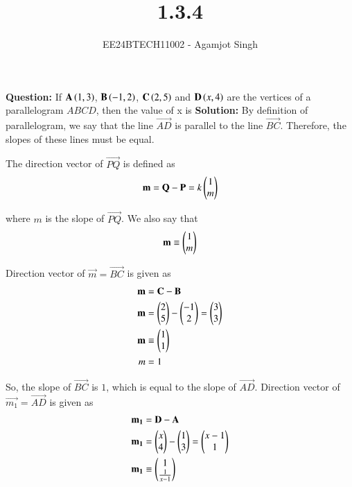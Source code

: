 \documentclass[journal]{IEEEtran}
\begin{document}

\vspace{3cm}

\title{1.3.4}
\author{EE24BTECH11002 - Agamjot Singh
}
{\let\newpage\relax\maketitle}

\renewcommand{\thefigure}{\theenumi}
\renewcommand{\thetable}{\theenumi}
\setlength{\intextsep}{10pt} %

\textbf{Question:}
\newline
If $\mathbf{A}\left(1,3\right)$, $\mathbf{B}\left(-1,2\right)$, $\mathbf{C}\left(2,5\right)$ and $\mathbf{D}\left(x,4\right)$ are the vertices of a parallelogram $ABCD$, then the value of x is
\newline
\textbf{Solution:}
By definition of parallelogram, we say that the line $\vec{AD}$ is parallel to the line $\vec{BC}$. 
Therefore, the slopes of these lines must be equal.
\newline

The direction vector of $\vec{PQ}$ is defined as
\begin{align*}
	\mathbf{m} = \mathbf{Q} - \mathbf{P} = k\begin{pmatrix}1\\m\end{pmatrix}
\end{align*}

where $m$ is the slope of $\vec{PQ}$. We also say that
\begin{align*}
	\mathbf{m}\equiv\begin{pmatrix}1\\m\end{pmatrix}
\end{align*}

Direction vector of $\vec{m} = \vec{BC}$ is given as
\begin{align}
	\mathbf{m}  &= \mathbf{C} - \mathbf{B}\\
	\mathbf{m}  &= \begin{pmatrix}2\\5\end{pmatrix}  - \begin{pmatrix}-1\\2\end{pmatrix}
		 = \begin{pmatrix}3\\3\end{pmatrix}\\
	\mathbf{m}  &\equiv \begin{pmatrix}1\\1\end{pmatrix}\\
	       m &= 1	
\end{align}

So, the slope of $\vec{BC}$ is $1$, which is equal to the slope of $\vec{AD}$.
\newline
Direction vector of $\vec{m_1} = \vec{AD}$ is given as
\begin{align}
	\mathbf{m_1} &= \mathbf{D} - \mathbf{A}\\
	\mathbf{m_1} &= \begin{pmatrix}x\\4\end{pmatrix} - \begin{pmatrix}1\\3\end{pmatrix}
		   = \begin{pmatrix}x-1\\1\end{pmatrix}\\
	\mathbf{m_1} &\equiv \begin{pmatrix}1\\\frac{1}{x-1}\end{pmatrix}
\end{align}
\end{document}
